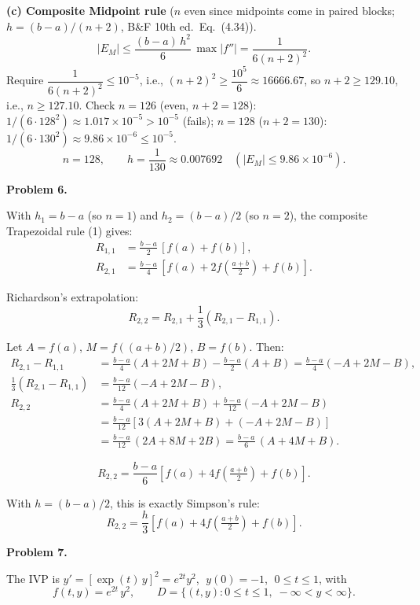 \documentclass[12pt,letterpaper]{article}
\begin{document}
\textbf{(c) Composite Midpoint rule} ($n$ even since midpoints come in paired blocks; $h = (b-a)/(n+2)$, B\&F 10th ed.\ Eq.~(4.34)).
\[
|E_M| \le \frac{(b-a)\,h^2}{6}\,\max|f''| = \frac{1}{6 (n+2)^2}.
\]
Require $\dfrac{1}{6 (n+2)^2} \le 10^{-5}$, i.e., $(n+2)^2 \ge \dfrac{10^5}{6} \approx 16666.67$, so $n + 2 \ge 129.10$, i.e., $n \ge 127.10$.
Check $n = 126$ (even, $n+2=128$): $1/(6 \cdot 128^2) \approx 1.017 \times 10^{-5} > 10^{-5}$ (fails); $n = 128$ ($n+2 = 130$): $1/(6 \cdot 130^2) \approx 9.86 \times 10^{-6} \le 10^{-5}$.
\[
\boxed{n = 128, \qquad h = \frac{1}{130} \approx 0.007692 \quad (|E_M| \le 9.86 \times 10^{-6}).}
\]



\textbf{Problem 6.}

With $h_1 = b - a$ (so $n = 1$) and $h_2 = (b-a)/2$ (so $n = 2$), the composite Trapezoidal rule (1) gives:
\begin{align*}
R_{1,1} &= \frac{b - a}{2}\,[f(a) + f(b)], \\[3pt]
R_{2,1} &= \frac{b - a}{4}\,\!\left[f(a) + 2 f\!\left(\tfrac{a+b}{2}\right) + f(b)\right].
\end{align*}

Richardson's extrapolation:
\[
R_{2,2} = R_{2,1} + \frac{1}{3}(R_{2,1} - R_{1,1}).
\]

Let $A = f(a)$, $M = f((a+b)/2)$, $B = f(b)$. Then:
\begin{align*}
R_{2,1} - R_{1,1} &= \frac{b-a}{4}(A + 2M + B) - \frac{b-a}{2}(A + B)
= \frac{b-a}{4}(-A + 2M - B), \\[3pt]
\frac{1}{3}(R_{2,1} - R_{1,1}) &= \frac{b-a}{12}(-A + 2M - B), \\[3pt]
R_{2,2} &= \frac{b-a}{4}(A + 2M + B) + \frac{b-a}{12}(-A + 2M - B) \\
       &= \frac{b-a}{12}\!\left[3(A + 2M + B) + (-A + 2M - B)\right] \\
       &= \frac{b-a}{12}\,(2A + 8M + 2B) = \frac{b - a}{6}\,(A + 4M + B).
\end{align*}

\[
\boxed{R_{2,2} = \frac{b-a}{6}\!\left[f(a) + 4 f\!\left(\tfrac{a+b}{2}\right) + f(b)\right].}
\]

With $h = (b-a)/2$, this is exactly Simpson's rule:
\[
R_{2,2} = \frac{h}{3}\!\left[f(a) + 4 f\!\left(\tfrac{a+b}{2}\right) + f(b)\right].
\]



\textbf{Problem 7.}

The IVP is $y' = [\exp(t)\,y]^2 = e^{2t} y^2$, $\;y(0) = -1$, $\;0 \le t \le 1$, with
\[
f(t, y) = e^{2t}\, y^2, \qquad D = \{(t, y) : 0 \le t \le 1, \; -\infty < y < \infty\}.
\]
\end{document}
